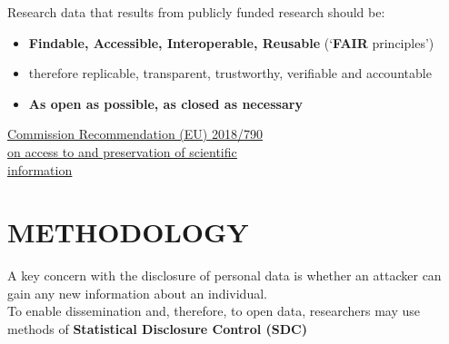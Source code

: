 \documentclass[a0,portrait]{a0poster}
\begin{document}
\begin{multicols}{3}
Research data that results from publicly funded research should be:

\color{uzhockerrot100}
\begin{itemize}
\item \textbf{Findable, Accessible, Interoperable, Reusable} (‘\textbf{FAIR} principles’) \cite{2022_EUA}
\color{black}
\item therefore replicable, transparent, trustworthy, verifiable and accountable
\color{uzhockerrot100}
\item \textbf{As open as possible, as closed as necessary}
\end{itemize}
\color{black}

\href{https://eur-lex.europa.eu/legal-content/EN/TXT/?uri=CELEX%3A32018H0790&qid=1701691098601}{\color{blue}\underline{Commission Recommendation (EU) 2018/790}} \\
\href{https://eur-lex.europa.eu/legal-content/EN/TXT/?uri=CELEX%3A32018H0790&qid=1701691098601}{\color{blue}\underline{on access to and preservation of scientific}} \\
\href{https://eur-lex.europa.eu/legal-content/EN/TXT/?uri=CELEX%3A32018H0790&qid=1701691098601}{\color{blue}\underline{information}}

\section{METHODOLOGY}

A key concern with the disclosure of personal data is whether an attacker can gain any new information about an individual. \\
To enable dissemination and, therefore, to open data, researchers may use methods of \textbf{Statistical Disclosure Control (SDC)} \cite{2012_Hundepool}


\end{multicols}
\end{document}
